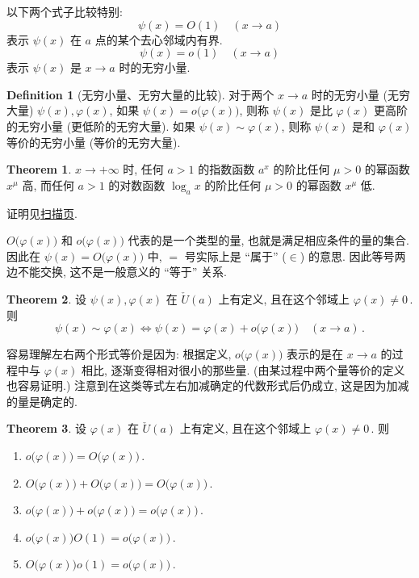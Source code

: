 \documentclass{book}
\newcommand{\bideduce}{\Longleftrightarrow}
\newcommand{\puncU}[1]{\check{U}\!\left( #1 \right)}
\numberwithin{equation}{section}
\numberwithin{figure}{section}
\theoremstyle{definition}
\newtheorem{definition}{Definition}
\newtheorem{theorem}{Theorem}[section]
\begin{document}
以下两个式子比较特别:
\begin{equation*}
  \psi(x)=O(1)\quad(x\to a)
\end{equation*}
表示 $\psi(x)$ 在 $a$ 点的某个去心邻域内有界.
\begin{equation*}
  \psi(x)=o(1)\quad(x\to a)
\end{equation*}
表示 $\psi(x)$ 是 $x\to a$ 时的无穷小量.

\begin{definition}[无穷小量、无穷大量的比较]
  对于两个 $x\to a$ 时的无穷小量 (无穷大量) $\psi(x),\varphi(x)$, 如果 $\psi(x)=o\big( \varphi(x) \big)$, 则称 $\psi(x)$ 是比 $\varphi(x)$ 更高阶的无穷小量 (更低阶的无穷大量). 如果 $\psi(x)\sim \varphi(x)$, 则称 $\psi(x)$ 是和 $\varphi(x)$ 等价的无穷小量 (等价的无穷大量).
\end{definition}

\begin{theorem}
  $x\to+\infty$ 时, 任何 $a>1$ 的指数函数 $a^x$ 的阶比任何 $\mu>0$ 的幂函数 $x^\mu$ 高, 而任何 $a>1$ 的对数函数 $\log_a x$ 的阶比任何 $\mu>0$ 的幂函数 $x^\mu$ 低.
\end{theorem}
证明见\hyperlink{scan:ExponentFunctionPowerFunctionLogFunction}{扫描页}.

$O\big( \varphi(x) \big)$ 和 $o\big( \varphi(x) \big)$ 代表的是一个类型的量, 也就是满足相应条件的量的集合. 因此在 $\psi(x)=O\big( \varphi(x) \big)$ 中, $=$ 号实际上是 ``属于'' ($\in$) 的意思. 因此等号两边不能交换, 这不是一般意义的 ``等于'' 关系.
\begin{theorem}
  设 $\psi(x),\varphi(x)$ 在 $\puncU{a}$ 上有定义, 且在这个邻域上 $\varphi(x)\neq0$\,. 则
  \begin{equation*}
    \psi(x)\sim\varphi(x)\bideduce\psi(x)=\varphi(x)+o\big( \varphi(x) \big)\quad (x\to a)\,.
  \end{equation*}
\end{theorem}
容易理解左右两个形式等价是因为: 根据定义, $o\big( \varphi(x) \big)$ 表示的是在 $x\to a$ 的过程中与 $\varphi(x)$ 相比, 逐渐变得相对很小的那些量.
(由某过程中两个量等价的定义也容易证明.) 注意到在这类等式左右加减确定的代数形式后仍成立, 这是因为加减的量是确定的.

\begin{theorem}
  设 $\varphi(x)$ 在 $\puncU{a}$ 上有定义, 且在这个邻域上 $\varphi(x)\neq0$\,. 则
  \begin{enumerate}
    \item $o\big( \varphi(x) \big)=O\big( \varphi(x) \big)$\,.
    \item $O\big( \varphi(x) \big)+O\big( \varphi(x) \big)=O\big( \varphi(x) \big)$\,.
    \item $o\big( \varphi(x) \big)+o\big( \varphi(x) \big)=o\big( \varphi(x) \big)$\,.
    \item $o\big( \varphi(x) \big)O(1)=o\big( \varphi(x) \big)$\,.
    \item $O\big( \varphi(x) \big)o(1)=o\big( \varphi(x) \big)$\,.
  \end{enumerate}
\end{theorem}
\end{document}
